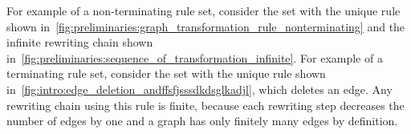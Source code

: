 For example of a non-terminating rule set, consider the set with the unique rule shown in~\autoref{fig:preliminaries:graph_transformation_rule_nonterminating} and the infinite rewriting chain shown in~\autoref{fig:preliminaries:sequence_of_transformation_infinite}. 
For example of a terminating rule set, consider the set with the unique rule shown in~\autoref{fig:intro:edge_deletion_andffsfjsssdkdsglkadjl}, which deletes an edge. Any rewriting chain using this rule is finite, because each rewriting step decreases the number of edges by one and a graph has only finitely many edges by definition.
 \begin{figure}[H]
    \centering
                \caption{}
                \label{fig:intro:edge_deletion_andffsfjsssdkdsglkadjl}
        \end{figure}

